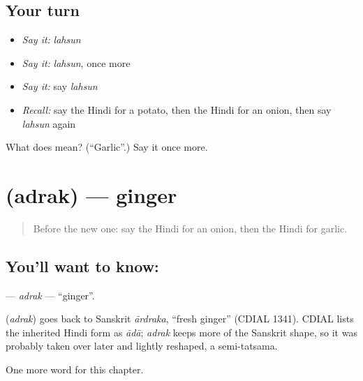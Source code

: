 \subsection*{Your turn}
\begin{itemize}
\raggedright
  \item \emph{Say it:} \emph{lahsun}
  \item \emph{Say it:} \emph{lahsun}, once more
  \item \emph{Say it:} say \emph{lahsun}
  \item \emph{Recall:} say the Hindi for a potato, then the Hindi for an onion, then say \emph{lahsun} again
\end{itemize}

\begin{tcolorbox}[breakable,colback=teal!4,colframe=teal!35!black,title={Before you move on}]
What does  mean? (\textquotedblleft{}Garlic\textquotedblright{}.) Say it once more.
\end{tcolorbox}
\section[\texorpdfstring{\hi{अदरक} (adrak)}{अदरक (adrak)}]{ (adrak) — ginger}

\label{lesson:HI-C138-adrak}



\begin{quote}
Before the new one: say the Hindi for an onion, then the Hindi for garlic.
\end{quote}

\subsection*{You'll want to know: }
\textbf{} — \emph{adrak} — \textquotedblleft{}ginger\textquotedblright{}.

\begin{cousinweb}
\textbf{} (\emph{adrak}) goes back to Sanskrit \emph{ārdraka}, \textquotedblleft{}fresh ginger\textquotedblright{} (CDIAL 1341). CDIAL lists the inherited Hindi form as \emph{ādā}; \emph{adrak} keeps more of the Sanskrit shape, so it was probably taken over later and lightly reshaped, a semi-tatsama.
\end{cousinweb}

\begin{grammarlens}[title={What you've built}]
One more word for this chapter.
\end{grammarlens}

